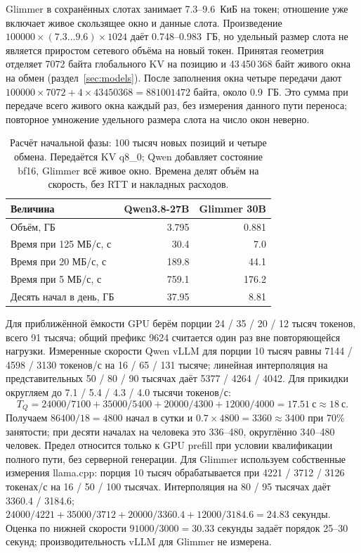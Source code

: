 Glimmer в сохранённых слотах занимает 7.3--9.6~КиБ на токен;
отношение уже включает живое скользящее окно и данные слота.
Произведение $100000\times(7.3\ldots9.6)\times1024$ даёт 0.748--0.983~ГБ,
но удельный размер слота не является приростом сетевого объёма на новый токен.
Принятая геометрия отделяет 7072 байта глобального KV на позицию и 43\,450\,368 байт живого окна на обмен
(раздел~\ref{sec:models}). После заполнения окна четыре передачи дают
$100000\times7072+4\times43450368=881001472$ байта, около 0.9~ГБ.
Это сумма при передаче всего живого окна каждый раз, без измерения данного пути переноса;
повторное умножение удельного размера слота на число окон неверно.

\begin{table}[t]
\centering\footnotesize
\caption{Расчёт начальной фазы: 100 тысяч новых позиций и четыре обмена. Передаётся KV q8\_0;
Qwen добавляет состояние bf16, Glimmer всё живое окно. Времена делят объём на скорость, без RTT и накладных расходов.}
\label{tab:start-traffic}
\begin{tabular}{lrr}
\toprule
Величина & Qwen3.8-27B & Glimmer 30B \\
\midrule
Объём, ГБ & 3.795 & 0.881 \\
Время при 125 МБ/с, с & 30.4 & 7.0 \\
Время при 20 МБ/с, с & 189.8 & 44.1 \\
Время при 5 МБ/с, с & 759.1 & 176.2 \\
Десять начал в день, ГБ & 37.95 & 8.81 \\
\bottomrule
\end{tabular}
\end{table}

Для приближённой ёмкости GPU берём порции 24 / 35 / 20 / 12 тысяч токенов, всего 91 тысяча;
общий префикс 9624 считается один раз вне повторяющейся нагрузки.
Измеренные скорости Qwen vLLM для порции 10 тысяч равны 7144 / 4598 / 3130 токенов/с
на 16 / 65 / 131 тысяче; линейная интерполяция на представительных 50 / 80 / 90 тысячах
даёт 5377 / 4264 / 4042. Для прикидки округляем до 7.1 / 5.4 / 4.3 / 4.0 тысячи токенов/с:
\[
T_Q=24000/7100+35000/5400+20000/4300+12000/4000=17.51~\text{с}\approx18~\text{с}.
\]
Получаем $86400/18=4800$ начал в сутки и $0.7\times4800=3360\approx3400$ при 70\% занятости;
при десяти началах на человека это 336--480, округлённо 340--480 человек.
Предел относится только к GPU prefill при условии квалификации полного пути, без серверной генерации.
Для Glimmer используем собственные измерения llama.cpp: порция 10 тысяч обрабатывается при
4221 / 3712 / 3126 токенах/с на 16 / 50 / 100 тысячах.
Интерполяция на 80 / 95 тысячах даёт 3360.4 / 3184.6;
$24000/4221+35000/3712+20000/3360.4+12000/3184.6=24.83$ секунды.
Оценка по нижней скорости $91000/3000=30.33$ секунды задаёт порядок 25--30 секунд;
производительность vLLM для Glimmer не измерена.

